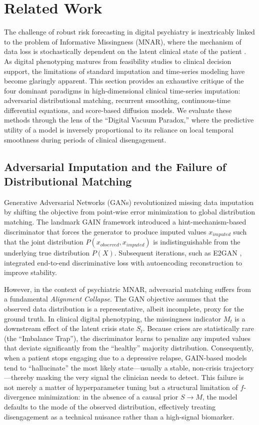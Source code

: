 \section{Related Work}
\label{sec:related_work}

The challenge of robust risk forecasting in digital psychiatry is inextricably linked to the problem of Informative Missingness (MNAR), where the mechanism of data loss is stochastically dependent on the latent clinical state of the patient \cite{nock2026predicting}. As digital phenotyping matures from feasibility studies to clinical decision support, the limitations of standard imputation and time-series modeling have become glaringly apparent. This section provides an exhaustive critique of the four dominant paradigms in high-dimensional clinical time-series imputation: adversarial distributional matching, recurrent smoothing, continuous-time differential equations, and score-based diffusion models. We evaluate these methods through the lens of the ``Digital Vacuum Paradox,'' where the predictive utility of a model is inversely proportional to its reliance on local temporal smoothness during periods of clinical disengagement.

\subsection{Adversarial Imputation and the Failure of Distributional Matching}

Generative Adversarial Networks (GANs) revolutionized missing data imputation by shifting the objective from point-wise error minimization to global distribution matching. The landmark GAIN framework \cite{yoon2018gain} introduced a hint-mechanism-based discriminator that forces the generator to produce imputed values $x_{imputed}$ such that the joint distribution $P(x_{observed}, x_{imputed})$ is indistinguishable from the underlying true distribution $P(X)$. Subsequent iterations, such as E2GAN \cite{luo2019e2gan}, integrated end-to-end discriminative loss with autoencoding reconstruction to improve stability.

However, in the context of psychiatric MNAR, adversarial matching suffers from a fundamental \textit{Alignment Collapse}. The GAN objective assumes that the observed data distribution is a representative, albeit incomplete, proxy for the ground truth. In clinical digital phenotyping, the missingness indicator $M_t$ is a downstream effect of the latent crisis state $S_t$. Because crises are statistically rare (the ``Imbalance Trap''), the discriminator learns to penalize any imputed values that deviate significantly from the ``healthy'' majority distribution. Consequently, when a patient stops engaging due to a depressive relapse, GAIN-based models tend to ``hallucinate'' the most likely state—usually a stable, non-crisis trajectory—thereby masking the very signal the clinician needs to detect. This failure is not merely a matter of hyperparameter tuning but a structural limitation of $f$-divergence minimization: in the absence of a causal prior $S \rightarrow M$, the model defaults to the mode of the observed distribution, effectively treating disengagement as a technical nuisance rather than a high-signal biomarker.

